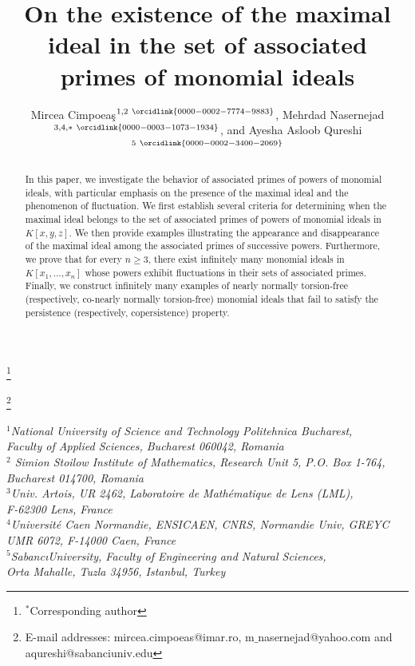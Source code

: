 \documentclass[11pt]{amsart}
\begin{document}
\author[
M. Cimpoea\c{s}, M. Nasernejad and A. A. Qureshi
]{
Mircea Cimpoea\c{s}$^{1,2~\orcidlink{0000-0002-7774-9883}}$,
Mehrdad Nasernejad$^{3,4,*~\orcidlink{0000-0003-1073-1934}}$, and
Ayesha Asloob Qureshi$^{5~\orcidlink{0000-0002-3400-2069}}$
}

\title[On the existence of  the maximal ideal]{On the existence of  the maximal ideal in  the set of associated primes of monomial ideals}

\thanks{$^*$Corresponding author}


\thanks{E-mail addresses:  mircea.cimpoeas@imar.ro, m$\_$nasernejad@yahoo.com and    aqureshi@sabanciuniv.edu}  
\maketitle

\begin{center}
{\it
$^{1}$National University of Science and Technology Politehnica Bucharest,\\
Faculty of Applied Sciences, Bucharest 060042, Romania\\
$^{2}$
Simion Stoilow Institute of Mathematics, Research Unit 5, P.O. Box 1-764, Bucharest 014700, Romania\\
$^{3}$Univ. Artois, UR 2462, Laboratoire de Math\'{e}matique de  Lens (LML), \\  F-62300 Lens, France \\ 
$^{4}$Universit\'e  Caen Normandie, ENSICAEN, CNRS, Normandie Univ, GREYC UMR  6072, F-14000 Caen,  France\\
$^{5}$Sabanc\i\;University, Faculty of Engineering and Natural Sciences, \\
Orta Mahalle, Tuzla 34956, Istanbul, Turkey 
}
\end{center}


\vspace{0.4cm}


\begin{abstract}
In this paper, we investigate the behavior of associated primes of powers of monomial ideals, with particular emphasis on the presence of the maximal ideal and the phenomenon of fluctuation. We first establish several criteria for determining when the maximal ideal belongs to the set of associated primes of powers of monomial ideals in $K[x,y,z]$. We then provide examples illustrating the appearance and disappearance of the maximal ideal among the associated primes of successive powers. Furthermore, we prove that for every $n\geq 3$, there exist infinitely many monomial ideals in $K[x_1,\ldots,x_n]$ whose powers exhibit fluctuations in their sets of associated primes. Finally, we construct infinitely many examples of nearly normally torsion-free (respectively, co-nearly normally torsion-free) monomial ideals that fail to satisfy the persistence (respectively, copersistence) property.
\end{abstract}
\end{document}
